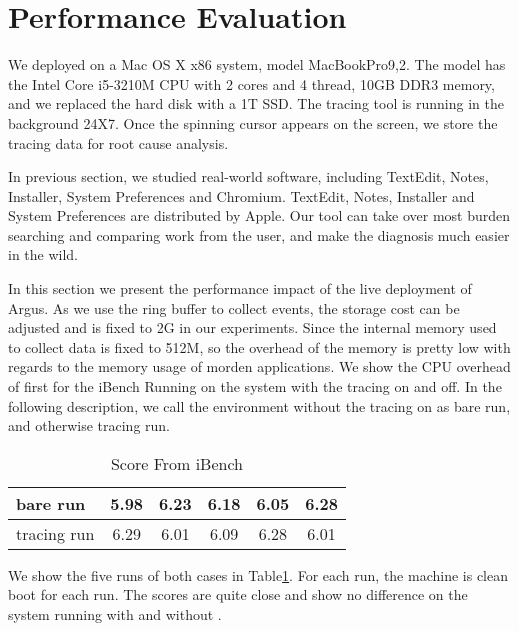 \section{Performance Evaluation}
\label{sec:evaluation}
We deployed \xxx on a Mac OS X x86 system, model MacBookPro9,2.  The
model has the Intel Core i5-3210M CPU with 2 cores and 4 thread, 10GB DDR3
memory, and we replaced the hard disk with a 1T SSD.  The tracing tool is
running in the background 24X7.  Once the spinning cursor appears on the
screen, we store the tracing data for root cause analysis.

In previous section, we studied real-world software, including TextEdit,
Notes, Installer, System Preferences and Chromium. TextEdit, Notes, Installer and System
Preferences are distributed by Apple.  
Our tool can take over most burden searching and comparing work from the user,
and make the diagnosis much easier in the wild.

In this section we present the performance impact of the live deployment of Argus.
As we use the ring buffer to collect events, the storage cost can be adjusted
and is fixed to 2G in our experiments.
Since the internal memory used to collect data is fixed to 512M, so the overhead of the
memory is pretty low with regards to the memory usage of  morden applications.
We show the CPU overhead of \xxx first for the iBench Running on the system with the tracing
on and off. In the following description, we call the environment without the tracing on as
bare run, and otherwise tracing run.

\begin{table}[h]
\begin{tabular}{|l|c|c|c|c|c|}
\hline
 bare run & 5.98 & 6.23 & 6.18 & 6.05 & 6.28\\
\hline
 tracing run& 6.29 & 6.01 & 6.09 & 6.28 & 6.01\\
\hline
\end{tabular}
\caption{Score From iBench}
\label{tab:ibench}
\end{table}
We show the five runs of both cases in Table\ref{tab:ibench}.
For each run, the machine is clean boot for each run.
The scores are quite close and show no difference on the system running with and without \xxx.


